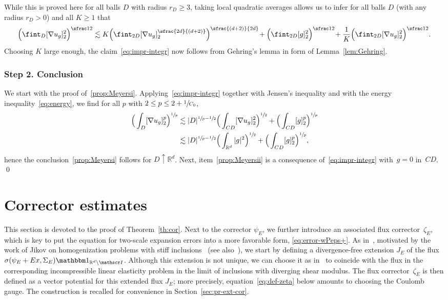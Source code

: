\documentclass[10pt]{amsart}
\let\mathcal\mathscr
\newcommand{\psfrac}[2]{\sfrac{(#1)}{#2}}
\newcommand{\spfrac}[2]{\sfrac{#1}{(#2)}}
\let\mathds\mathbbm
\theoremstyle{plain}
\theoremstyle{definition}
\newcommand{\R}{\mathbb R}
\newcommand{\Ic}{\mathcal I}
\newcommand{\step}[1]{\subsubsection*{Step #1}}
\begin{document}
While this is proved here for all balls $D$ with radius $r_D\ge3$, taking local quadratic averages allows us to infer for all balls $D$ (with any radius $r_D>0$) and all $K\ge1$ that
\begin{equation*}
\Big(\fint_{D}[\nabla u_g]_2^2\Big)^{\sfrac12}
\lesssim K\Big(\fint_{2D}[\nabla u_g]_2^{\spfrac{2d}{d+2}}\Big)^{\psfrac{d+2}{2d}}\!+\Big(\fint_{2D}[g]_2^2\Big)^{\sfrac12}\!+\frac1K\Big(\fint_{2D}[\nabla u_g]_2^2\Big)^{\sfrac12}.
\end{equation*}
Choosing $K$ large enough, the claim~\eqref{eq:impr-integr} now follows from Gehring's lemma in form of Lemma~\ref{lem:Gehring}.

\step{2. Conclusion}
We start with the proof of~\eqref{prop:Meyersi}.
Applying~\eqref{eq:impr-integr} together with Jensen's inequality and with the energy inequality~\eqref{eq:energy}, we find for all $p$ with \hbox{$2\le p\le2+\sfrac1{C_0}$},
\begin{align*}
\Big(\int_{D}[\nabla u_g]_2^p\Big)^{\sfrac1p}
&\lesssim |D|^{\sfrac1p-\sfrac12}\Big(\int_{CD}[\nabla u_g]_2^2\Big)^{\sfrac12}+\Big(\int_{CD}[g]_2^p\Big)^{\sfrac1p}\\
&\lesssim |D|^{\sfrac1p-\sfrac12}\Big(\int_{\R^d}|g|^2\Big)^{\sfrac12}+\Big(\int_{CD}[g]_2^p\Big)^{\sfrac1p},
\end{align*}
hence the conclusion~\eqref{prop:Meyersi} follows for $D\uparrow\R^d$.
Next, item~\eqref{prop:Meyersii} is a consequence of~\eqref{eq:impr-integr} with~$g=0$ in~$CD$.
\qed

\section{Corrector estimates}
This section is devoted to the proof of Theorem~\ref{th:cor}.
Next to the corrector $\psi_E$, we further introduce an associated flux corrector~$\zeta_E$,
which is key to put the equation for two-scale expansion errors into a more favorable form, \cf \eqref{eq:error-wPeps+}.
As in~\cite[Th.\,4]{D-20}, moti\-vated by the work of Jikov on homogenization problems with stiff inclusions~\hbox{\cite{Jikov-87,Jikov-90}} (see also~\cite[\S 3.2]{JKO94}), we start by defining a divergence-free extension $J_E$ of the flux $\sigma(\psi_E+Ex,\Sigma_E)\mathds1_{\R^d\setminus\Ic}$.
Although this extension is not unique, we can choose it as in~\cite{D-20} to coincide with the flux in the corresponding incompressible linear elasticity problem in the limit of inclusions with diverging shear modulus.
The flux corrector~$\zeta_E$ is then defined as a vector potential for this extended flux $J_E$; more precisely, equation~\eqref{eq:def-zeta} below amounts to choosing the Coulomb gauge. The construction is recalled for convenience in Section~\ref{sec:pr-ext-cor}.
\end{document}
